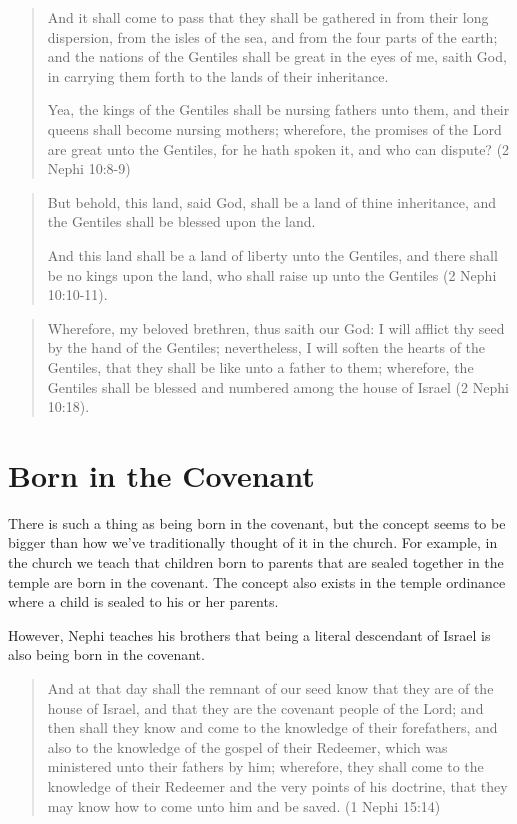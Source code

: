 \begin{quotation}
And it shall come to pass that they shall be gathered in from their long dispersion, from the isles of the sea, and from the four parts of the earth; and the nations of the Gentiles shall be great in the eyes of me, saith God, in carrying them forth to the lands of their inheritance.

Yea, the kings of the Gentiles shall be nursing fathers unto them, and their queens shall become nursing mothers; wherefore, the promises of the Lord are great unto the Gentiles, for he hath spoken it, and who can dispute? (2 Nephi 10:8-9)
\end{quotation}

\begin{quotation}
But behold, this land, said God, shall be a land of thine inheritance, and the Gentiles shall be blessed upon the land.

And this land shall be a land of liberty unto the Gentiles, and there shall be no kings upon the land, who shall raise up unto the Gentiles (2 Nephi 10:10-11).
\end{quotation}

\begin{quotation}
Wherefore, my beloved brethren, thus saith our God: I will afflict thy seed by the hand of the Gentiles; nevertheless, I will soften the hearts of the Gentiles, that they shall be like unto a father to them; wherefore, the Gentiles shall be blessed and numbered among the house of Israel (2 Nephi 10:18).
\end{quotation}


\section{Born in the Covenant}

There is such a thing as being born in the covenant, but the concept seems to be bigger than how we've traditionally thought of it in the church. For example, in the church we teach that children born to parents that are sealed together in the temple are born in the covenant. The concept also exists in the temple ordinance where a child is sealed to his or her parents.

However, Nephi teaches his brothers that being a literal descendant of Israel is also being born in the covenant. 

\begin{quotation}
And at that day shall the remnant of our seed know that they are of the house of Israel, and that they are the covenant people of the Lord; and then shall they know and come to the knowledge of their forefathers, and also to the knowledge of the gospel of their Redeemer, which was ministered unto their fathers by him; wherefore, they shall come to the knowledge of their Redeemer and the very points of his doctrine, that they may know how to come unto him and be saved. (1 Nephi 15:14)
\end{quotation}

